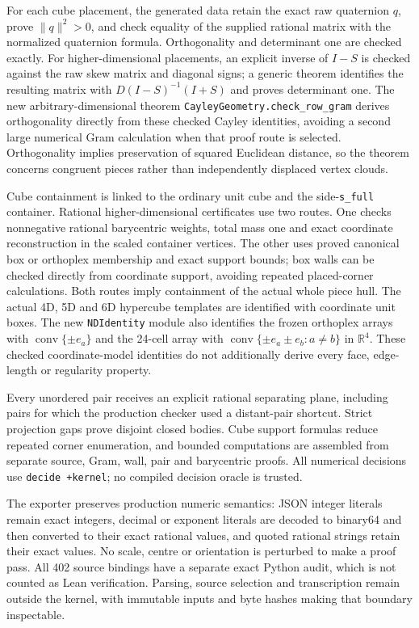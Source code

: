 \documentclass[11pt,a4paper]{article}
\newcommand{\R}{\mathbb R}
\newcommand{\conv}{\operatorname{conv}}
\newcommand{\code}[1]{\texttt{\nolinkurl{#1}}}
\begin{document}
For each cube placement, the generated data retain the exact raw quaternion $q$, prove $\lVert q\rVert^2>0$, and check equality of the supplied rational matrix with the normalized quaternion formula. Orthogonality and determinant one are checked exactly. For higher-dimensional placements, an explicit inverse of $I-S$ is checked against the raw skew matrix and diagonal signs; a generic theorem identifies the resulting matrix with $D(I-S)^{-1}(I+S)$ and proves determinant one. The new arbitrary-dimensional theorem \code{CayleyGeometry.check_row_gram} derives orthogonality directly from these checked Cayley identities, avoiding a second large numerical Gram calculation when that proof route is selected. Orthogonality implies preservation of squared Euclidean distance, so the theorem concerns congruent pieces rather than independently displaced vertex clouds.

Cube containment is linked to the ordinary unit cube and the side-\code{s_full} container. Rational higher-dimensional certificates use two routes. One checks nonnegative rational barycentric weights, total mass one and exact coordinate reconstruction in the scaled container vertices. The other uses proved canonical box or orthoplex membership and exact support bounds; box walls can be checked directly from coordinate support, avoiding repeated placed-corner calculations. Both routes imply containment of the actual whole piece hull. The actual 4D, 5D and 6D hypercube templates are identified with coordinate unit boxes. The new \code{NDIdentity} module also identifies the frozen orthoplex arrays with $\conv\{\pm e_a\}$ and the 24-cell array with $\conv\{\pm e_a\pm e_b:a\ne b\}$ in $\R^4$. These checked coordinate-model identities do not additionally derive every face, edge-length or regularity property.

Every unordered pair receives an explicit rational separating plane, including pairs for which the production checker used a distant-pair shortcut. Strict projection gaps prove disjoint closed bodies. Cube support formulas reduce repeated corner enumeration, and bounded computations are assembled from separate source, Gram, wall, pair and barycentric proofs. All numerical decisions use \code{decide +kernel}; no compiled decision oracle is trusted.

The exporter preserves production numeric semantics: JSON integer literals remain exact integers, decimal or exponent literals are decoded to binary64 and then converted to their exact rational values, and quoted rational strings retain their exact values. No scale, centre or orientation is perturbed to make a proof pass. All 402 source bindings have a separate exact Python audit, which is not counted as Lean verification. Parsing, source selection and transcription remain outside the kernel, with immutable inputs and byte hashes making that boundary inspectable.
\end{document}
